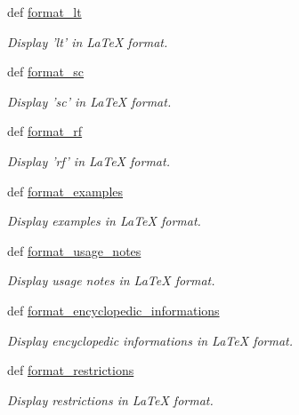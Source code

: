 \begin{DoxyCompactItemize}
def \hyperlink{namespacelmf_1_1src_1_1output_1_1tex_afc649c48058e216ab2187efa4ea3969e}{format\+\_\+lt}
\begin{DoxyCompactList}\small\item\em Display 'lt' in La\+Te\+X format. \end{DoxyCompactList}\item 
def \hyperlink{namespacelmf_1_1src_1_1output_1_1tex_a33262e30a0444e5f357a86053b4fe9e8}{format\+\_\+sc}
\begin{DoxyCompactList}\small\item\em Display 'sc' in La\+Te\+X format. \end{DoxyCompactList}\item 
def \hyperlink{namespacelmf_1_1src_1_1output_1_1tex_ab6b257f9eee12679dcbe70496073d841}{format\+\_\+rf}
\begin{DoxyCompactList}\small\item\em Display 'rf' in La\+Te\+X format. \end{DoxyCompactList}\item 
def \hyperlink{namespacelmf_1_1src_1_1output_1_1tex_a43cc9691809bfccc3057c93d9ca21f7d}{format\+\_\+examples}
\begin{DoxyCompactList}\small\item\em Display examples in La\+Te\+X format. \end{DoxyCompactList}\item 
def \hyperlink{namespacelmf_1_1src_1_1output_1_1tex_af173240b4ab1cbc3638fc66aa095bbdc}{format\+\_\+usage\+\_\+notes}
\begin{DoxyCompactList}\small\item\em Display usage notes in La\+Te\+X format. \end{DoxyCompactList}\item 
def \hyperlink{namespacelmf_1_1src_1_1output_1_1tex_a33e3fb3d76e135d0e729ffd2cc8eb1f3}{format\+\_\+encyclopedic\+\_\+informations}
\begin{DoxyCompactList}\small\item\em Display encyclopedic informations in La\+Te\+X format. \end{DoxyCompactList}\item 
def \hyperlink{namespacelmf_1_1src_1_1output_1_1tex_a4bb11e8aae90a0f5e4ce2745f21eee5e}{format\+\_\+restrictions}
\begin{DoxyCompactList}\small\item\em Display restrictions in La\+Te\+X format. \end{DoxyCompactList}\item 

\end{DoxyCompactItemize}
